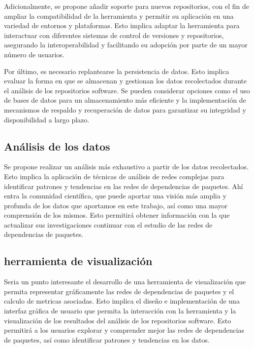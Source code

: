 Adicionalmente, se propone añadir soporte para nuevos repositorios, con el fin de ampliar la compatibilidad de la herramienta y 
permitir su aplicación en una variedad de entornos y plataformas. Esto implica adaptar la herramienta para interactuar con 
diferentes sistemas de control de versiones y repositorios, asegurando la interoperabilidad y facilitando su adopción por 
parte de un mayor número de usuarios.

Por último, es necesario replantearse la persistencia de datos. Esto implica evaluar la forma en que se almacenan y gestionan 
los datos recolectados durante el análisis de los repositorios software. Se pueden considerar opciones como el uso de bases de 
datos para un almacenamiento más eficiente y la implementación de mecanismos de respaldo y recuperación de datos para garantizar
 su integridad y disponibilidad a largo plazo.

\subsection{Análisis de los datos}

Se propone realizar un análisis más exhaustivo a partir de los datos recolectados. Esto implica la aplicación de técnicas de análisis
de redes complejas para identificar patrones y tendencias en las redes de dependencias de paquetes. Ahí entra la comunidad científica, que puede
aportar una visión más amplia y profunda de los datos que aportamos en este trabajo, así como una mayor comprensión de los mismos. Esto permitirá 
obtener información con la que actualizar sus investigaciones continuar con el estudio de las redes de dependencias de paquetes.

\subsection{herramienta de visualización}

Seria un punto interesante el desarrollo de una herramienta de visualización que permita representar gráficamente las redes de dependencias
de paquetes y el calculo de metricas asociadas. Esto implica el diseño e implementación de una interfaz gráfica de usuario que permita la 
interacción con la herramienta y la visualización de los resultados del análisis de los repositorios software. Esto permitirá a los usuarios
explorar y comprender mejor las redes de dependencias de paquetes, así como identificar patrones y tendencias en los datos.
